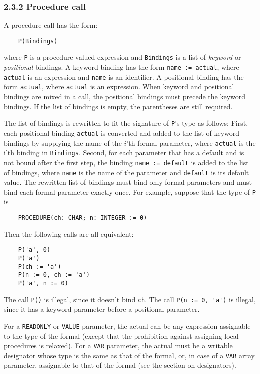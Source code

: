 \documentclass[10pt]{article}
\begin{document}
\subsubsection*{2.3.2 Procedure call}

A procedure call has the form:
\begin{verbatim}
    P(Bindings)
\end{verbatim}
where \verb|P| is a procedure-valued expression and \verb|Bindings| is a list
of \emph{keyword} or \emph{positional} bindings.  A keyword binding has the
form \verb|name := actual|, where \verb|actual| is an expression and
\verb|name| is an identifier.  A positional binding has the form
\verb|actual|, where \verb|actual| is an expression.  When keyword and
positional bindings are mixed in a call, the positional bindings must precede
the keyword bindings.  If the list of bindings is empty, the parentheses are
still required.

The list of bindings is rewritten to fit the signature of \verb|P|'s type as
follows: First, each positional binding \verb|actual| is converted and added
to the list of keyword bindings by supplying the name of the $i$'th formal
parameter, where \verb|actual| is the i'th binding in \verb|Bindings|.
Second, for each parameter that has a default and is not bound after the first
step, the binding \verb|name := default| is added to the list of bindings,
where \verb|name| is the name of the parameter and \verb|default| is its
default value.  The rewritten list of bindings must bind only formal
parameters and must bind each formal parameter exactly once.  For example,
suppose that the type of \verb|P| is
\begin{verbatim}
    PROCEDURE(ch: CHAR; n: INTEGER := 0)
\end{verbatim}
Then the following calls are all equivalent:
\begin{verbatim}
    P('a', 0)
    P('a')
    P(ch := 'a')
    P(n := 0, ch := 'a')
    P('a', n := 0)
\end{verbatim}
The call \verb|P()| is illegal, since it doesn't bind \verb|ch|.  The call
\verb|P(n := 0, 'a')| is illegal, since it has a keyword parameter before a
positional parameter.

For a \verb|READONLY| or \verb|VALUE| parameter, the actual can be any
expression assignable to the type of the formal (except that the prohibition
against assigning local procedures is relaxed).  For a \verb|VAR| parameter,
the actual must be a writable designator whose type is the same as that of the
formal, or, in case of a \verb|VAR| array parameter, assignable to that of the
formal (see the section on designators).
\end{document}

